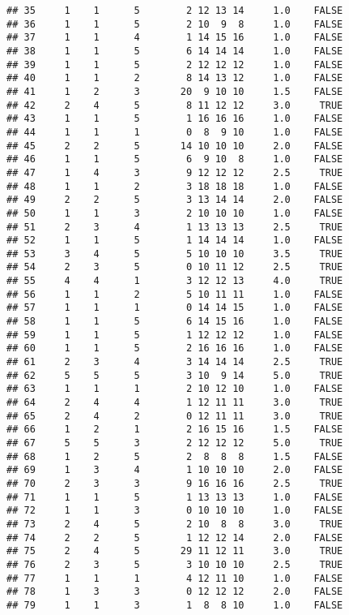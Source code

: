 \documentclass[]{article}
\begin{document}
\begin{verbatim}
## 35     1    1      5        2 12 13 14     1.0    FALSE
## 36     1    1      5        2 10  9  8     1.0    FALSE
## 37     1    1      4        1 14 15 16     1.0    FALSE
## 38     1    1      5        6 14 14 14     1.0    FALSE
## 39     1    1      5        2 12 12 12     1.0    FALSE
## 40     1    1      2        8 14 13 12     1.0    FALSE
## 41     1    2      3       20  9 10 10     1.5    FALSE
## 42     2    4      5        8 11 12 12     3.0     TRUE
## 43     1    1      5        1 16 16 16     1.0    FALSE
## 44     1    1      1        0  8  9 10     1.0    FALSE
## 45     2    2      5       14 10 10 10     2.0    FALSE
## 46     1    1      5        6  9 10  8     1.0    FALSE
## 47     1    4      3        9 12 12 12     2.5     TRUE
## 48     1    1      2        3 18 18 18     1.0    FALSE
## 49     2    2      5        3 13 14 14     2.0    FALSE
## 50     1    1      3        2 10 10 10     1.0    FALSE
## 51     2    3      4        1 13 13 13     2.5     TRUE
## 52     1    1      5        1 14 14 14     1.0    FALSE
## 53     3    4      5        5 10 10 10     3.5     TRUE
## 54     2    3      5        0 10 11 12     2.5     TRUE
## 55     4    4      1        3 12 12 13     4.0     TRUE
## 56     1    1      2        5 10 11 11     1.0    FALSE
## 57     1    1      1        0 14 14 15     1.0    FALSE
## 58     1    1      5        6 14 15 16     1.0    FALSE
## 59     1    1      5        1 12 12 12     1.0    FALSE
## 60     1    1      5        2 16 16 16     1.0    FALSE
## 61     2    3      4        3 14 14 14     2.5     TRUE
## 62     5    5      5        3 10  9 14     5.0     TRUE
## 63     1    1      1        2 10 12 10     1.0    FALSE
## 64     2    4      4        1 12 11 11     3.0     TRUE
## 65     2    4      2        0 12 11 11     3.0     TRUE
## 66     1    2      1        2 16 15 16     1.5    FALSE
## 67     5    5      3        2 12 12 12     5.0     TRUE
## 68     1    2      5        2  8  8  8     1.5    FALSE
## 69     1    3      4        1 10 10 10     2.0    FALSE
## 70     2    3      3        9 16 16 16     2.5     TRUE
## 71     1    1      5        1 13 13 13     1.0    FALSE
## 72     1    1      3        0 10 10 10     1.0    FALSE
## 73     2    4      5        2 10  8  8     3.0     TRUE
## 74     2    2      5        1 12 12 14     2.0    FALSE
## 75     2    4      5       29 11 12 11     3.0     TRUE
## 76     2    3      5        3 10 10 10     2.5     TRUE
## 77     1    1      1        4 12 11 10     1.0    FALSE
## 78     1    3      3        0 12 12 12     2.0    FALSE
## 79     1    1      3        1  8  8 10     1.0    FALSE

\end{verbatim}
\end{document}
